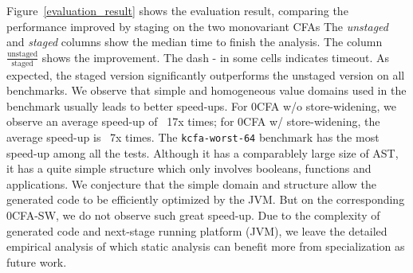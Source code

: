 Figure~\ref{evaluation_result} shows the evaluation result, comparing the
performance improved by staging on the two monovariant CFAs The
\textit{unstaged} and \textit{staged} columns show the median time to finish
the analysis. The column $\frac{\text{unstaged}}{\text{staged}}$ shows the
improvement. The dash - in some cells indicates timeout.  As
expected, the staged version significantly outperforms the unstaged version on
all benchmarks. We observe that simple and homogeneous value domains used in the
benchmark usually leads to better speed-ups.  For 0CFA w/o store-widening, we
observe an average speed-up of ~17x times; for 0CFA w/ store-widening, the
average speed-up is ~7x times.  The \texttt{kcfa-worst-64} benchmark has the most
speed-up among all the tests. Although it has a comparablely large size of AST,
it has a quite simple structure which only involves booleans, functions and
applications. We conjecture that the simple domain and structure allow the
generated code to be efficiently optimized by the JVM. But on the corresponding
0CFA-SW, we do not observe such great speed-up. Due to the complexity of
generated code and next-stage running platform (JVM), we leave the detailed
empirical analysis of which static analysis can benefit more from
specialization as future work.


